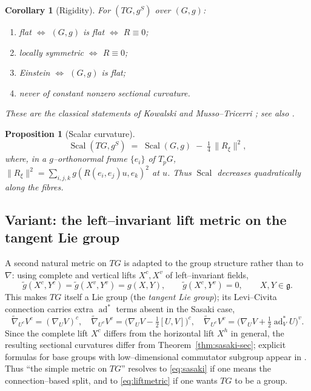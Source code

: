 \documentclass[11pt]{article}
\theoremstyle{definition}
\theoremstyle{plain}
\newtheorem{proposition}[definition]{Proposition}
\newtheorem{corollary}[definition]{Corollary}
\newcommand{\g}{\mathfrak{g}}
\newcommand{\Scal}{\operatorname{Scal}}
\newcommand{\ad}{\operatorname{ad}}
\newcommand{\hor}[1]{#1^{h}}
\newcommand{\ver}[1]{#1^{v}}
\newcommand{\cmp}[1]{#1^{c}}
\newcommand{\norm}[1]{\lVert #1 \rVert}
\newcommand{\TG}{TG}
\newcommand{\gS}{g^{S}}
\newcommand{\nablat}{\widetilde{\nabla}}
\begin{document}
\begin{corollary}[Rigidity]\label{cor:rigidity}
For $(\TG,\gS)$ over $(G,g)$:
\begin{enumerate}[label=\textup{(\roman*)}, leftmargin=2.2em]
  \item flat $\iff$ $(G,g)$ is flat $\iff$ $R\equiv0$;
  \item locally symmetric $\iff$ $R\equiv0$;
  \item Einstein $\iff$ $(G,g)$ is flat;
  \item never of constant nonzero sectional curvature.
\end{enumerate}
These are the classical statements of Kowalski \cite{Kowalski1971} and Musso--Tricerri
\cite{MussoTricerri1988}; see also \cite{GudmundssonKappos2002,Albuquerque2018}.
\end{corollary}

\begin{proposition}[Scalar curvature]\label{prop:scal}
\begin{equation}\label{eq:scal}
  \Scal(\TG,\gS)\;=\;\Scal(G,g)\;-\;\tfrac14\,\norm{R_\xi}^{2},
\end{equation}
where, in a $g$--orthonormal frame $\{e_i\}$ of $T_pG$,
$\norm{R_\xi}^{2}=\sum_{i,j,k}g(R(e_i,e_j)u,e_k)^{2}$ at $u$. Thus $\Scal$ decreases
quadratically along the fibres.
\end{proposition}

\subsection{Variant: the left--invariant lift metric on the tangent Lie group}
\label{sec:variant}

A second natural metric on $\TG$ is adapted to the group structure rather than to $\nabla$:
using complete and vertical lifts $\cmp{X},\ver{X}$ of left--invariant fields,
\begin{equation}\label{eq:liftmetric}
  \widetilde{g}(\cmp{X},\cmp{Y})=\widetilde{g}(\ver{X},\ver{Y})=g(X,Y),
  \qquad
  \widetilde{g}(\cmp{X},\ver{Y})=0 ,
  \qquad X,Y\in\g .
\end{equation}
This makes $\TG$ itself a Lie group (the \emph{tangent Lie group}); its Levi--Civita
connection carries extra $\ad^{*}$ terms absent in the Sasaki case,
\begin{equation}\label{eq:liftconn}
  \nablat_{\cmp{U}}\cmp{V}=(\nabla_U V)^{c},\quad
  \nablat_{\ver{U}}\ver{V}=\bigl(\nabla_U V-\tfrac12[U,V]\bigr)^{c},\quad
  \nablat_{\cmp{U}}\ver{V}=\bigl(\nabla_U V+\tfrac12\ad^{*}_V U\bigr)^{v}.
\end{equation}
Since the complete lift $\cmp{X}$ differs from the horizontal lift $\hor{X}$ in general, the
resulting sectional curvatures differ from Theorem~\ref{thm:sasaki-sec}; explicit formulas
for base groups with low--dimensional commutator subgroup appear in
\cite{HatamiSalimi2026}. Thus ``the simple metric on $\TG$'' resolves to \eqref{eq:sasaki}
if one means the connection--based split, and to \eqref{eq:liftmetric} if one wants $\TG$ to
be a group.
\end{document}
